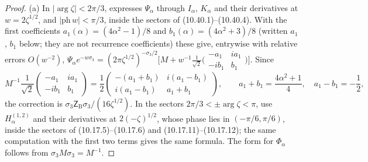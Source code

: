 \begin{proof}
(a) In $|\arg\zeta|<2\pi/3$, \cite[(6.23)]{KMVV} expresses $\Psi_\alpha$ through $I_\alpha$, $K_\alpha$ and their
derivatives at $w=2\zeta^{1/2}$, and $|\mathrm{ph}\,w|<\pi/3$, inside the sectors of (10.40.1)--(10.40.4). With the first
coefficients $a_1(\alpha)=(4\alpha^2-1)/8$ and $b_1(\alpha)=(4\alpha^2+3)/8$ (written $a_1$, $b_1$ below; they are not recurrence coefficients) these give, entrywise with relative errors
$O(w^{-2})$, $\Psi_\alpha e^{-w\sigma_3}=(2\pi\zeta^{1/2})^{-\sigma_3/2}\bigl[M+w^{-1}\frac1{\sqrt2}
\bigl(\begin{smallmatrix}-a_1&ia_1\\-ib_1&b_1\end{smallmatrix}\bigr)\bigr]$. Since
\[
  M^{-1}\frac1{\sqrt2}\begin{pmatrix}-a_1&ia_1\\-ib_1&b_1\end{pmatrix}=\frac12\begin{pmatrix}-(a_1+b_1)&i(a_1-b_1)\\i(a_1-b_1)&a_1+b_1\end{pmatrix},
  \qquad a_1+b_1=\frac{4\alpha^2+1}4,\quad a_1-b_1=-\frac12,
\]
the correction is $\sigma_3\mathsf Z_{\mathrm B}\sigma_3/(16\zeta^{1/2})$. In the sectors $2\pi/3<\pm\arg\zeta<\pi$,
\cite[(6.24)--(6.25)]{KMVV} use $H^{(1,2)}_\alpha$ and their derivatives at $2(-\zeta)^{1/2}$, whose phase lies in
$(-\pi/6,\pi/6)$, inside the sectors of (10.17.5)--(10.17.6) and (10.17.11)--(10.17.12); the same computation with the first two
terms gives the same formula. The form for $\Phi_\alpha$ follows from $\sigma_3M\sigma_3=M^{-1}$.


\end{proof}
